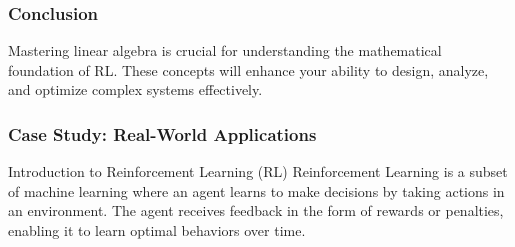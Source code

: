 \documentclass[aspectratio=169]{beamer}
\begin{document}
\begin{frame}[fragile]
    \frametitle{Conclusion}
    Mastering linear algebra is crucial for understanding the mathematical foundation of RL. These concepts will enhance your ability to design, analyze, and optimize complex systems effectively.
\end{frame}

\begin{frame}[fragile]
    \frametitle{Case Study: Real-World Applications}
    \begin{block}{Introduction to Reinforcement Learning (RL)}
        Reinforcement Learning is a subset of machine learning where an agent learns to make decisions by taking actions in an environment. The agent receives feedback in the form of rewards or penalties, enabling it to learn optimal behaviors over time.
    \end{block}
\end{frame}
\end{document}
